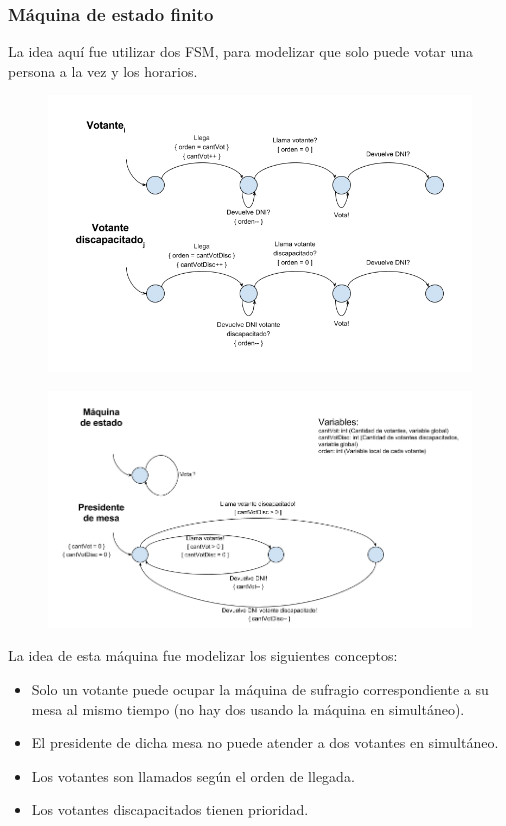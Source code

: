 \subsubsection{Máquina de estado finito}

La idea aquí fue utilizar dos FSM, para modelizar que solo puede votar una persona a la vez y los horarios.

\begin{figure}[h!]
\centering
\includegraphics[scale=0.45]{imagenes/FSMs/Sufragio/Unvotantealavez1}
\end{figure}


\begin{figure}[h!]
\centering
\includegraphics[scale=0.45]{imagenes/FSMs/Sufragio/Unvotantealavez2}
\end{figure}

La idea de esta máquina fue modelizar los siguientes conceptos:
\begin{itemize}
\item Solo un votante puede ocupar la máquina de sufragio correspondiente a su mesa al mismo tiempo (no hay dos usando la máquina en simultáneo).
\item El presidente de dicha mesa no puede atender a dos votantes en simultáneo.
\item Los votantes son llamados según el orden de llegada.
\item Los votantes discapacitados tienen prioridad.

\end{itemize}

